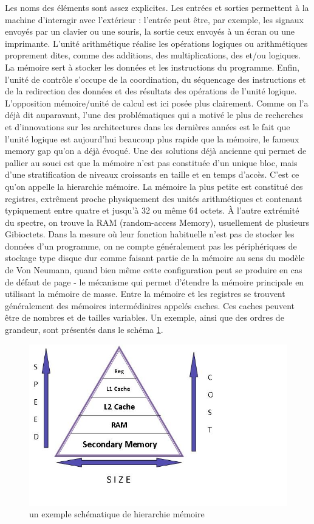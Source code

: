 \documentclass{report}
\begin{document}
Les noms des éléments sont assez explicites. Les entrées et sorties permettent à la machine d'interagir
avec l'extérieur : l'entrée peut être, par exemple, les signaux envoyés par un clavier ou une souris,
la sortie ceux envoyés à un écran ou une imprimante. L'unité arithmétique réalise les opérations logiques
ou arithmétiques proprement dites, comme des additions, des multiplications, des et/ou logiques. 
La mémoire sert à stocker les données et les instructions du programme. Enfin, l'unité de contrôle
s'occupe de la coordination, du séquencage des instructions et de la redirection des données et des
résultats des opérations de l'unité logique. 
\\L'opposition mémoire/unité de calcul est ici posée plus clairement. Comme on l'a déjà dit auparavant,
l'une des problématiques qui a motivé le plus de recherches et d'innovations sur les architectures dans
les dernières années est le fait que l'unité logique est aujourd'hui beaucoup plus rapide que la mémoire,
le fameux memory gap qu'on a déjà évoqué. Une des solutions déjà ancienne qui permet de pallier au souci
est que la mémoire n'est pas constituée d'un unique bloc, mais d'une stratification de niveaux croissants
en taille et en temps d'accès. C'est ce qu'on appelle la hierarchie mémoire. La mémoire la plus petite est
constitué des registres, extrêment proche physiquement des unités arithmétiques et contenant typiquement
entre quatre et jusqu'à 32  ou même 64 octets. À l'autre extrémité du spectre, on trouve la RAM 
(random-access Memory), usuellement de plusieurs Gibioctets. Dans la mesure où leur fonction habituelle 
n'est pas de stocker les données d'un programme, on ne compte généralement pas les périphériques de 
stockage type disque dur comme faisant partie de la mémoire au sens du modèle de Von Neumann, quand 
bien même cette configuration peut se produire en cas de défaut de page - le mécanisme qui permet 
d'étendre la mémoire principale en utilisant la mémoire de masse. Entre la mémoire et les registres 
se trouvent généralement des mémoires intermédiaires appelés caches. Ces caches peuvent être de nombres 
et de tailles variables. Un exemple, ainsi que des ordres de grandeur, sont présentés dans le schéma 
\ref{fig:memhier}.
\begin{figure}
  \centering
	\includegraphics[scale=0.5]{hierar.jpg}
  \caption{un exemple schématique de hierarchie mémoire}
  \label{fig:memhier}
\end{figure}
\end{document}
